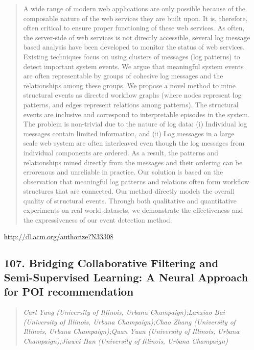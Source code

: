\documentclass{article}
\begin{document}
\begin{quote}
A wide range of modern web applications are only possible because of the composable nature of the web services they are built upon. It is, therefore, often critical to ensure proper functioning of these web services. As often, the server-side of web services is not directly accessible, several log message based analysis have been developed to monitor the status of web services. Existing techniques focus on using clusters of messages (log patterns) to detect important system events. We argue that meaningful system events are often representable by groups of cohesive log messages and the relationships among these groups. We propose a novel method to mine structural events as directed workflow graphs (where nodes represent log patterns, and edges represent relations among patterns). The structural events are inclusive and correspond to interpretable episodes in the system. The problem is non-trivial due to the nature of log data: (i) Individual log messages contain limited information, and (ii) Log messages in a large scale web system are often interleaved even though the log messages from individual components are ordered. As a result, the patterns and relationships mined directly from the messages and their ordering can be errorenous and unreliable in practice. Our solution is based on the observation that meaningful log patterns and relations often form workflow structures that are connected. Our method directly models the overall quality of structural events. Through both qualitative and quantitative experiments on real world datasets, we demonstrate the effectiveness and the expressiveness of our event detection method.
\end{quote}

\href{http://dl.acm.org/authorize?N33308}{http://dl.acm.org/authorize?N33308}

\subsection{107. Bridging Collaborative Filtering and Semi-Supervised Learning: A Neural Approach for POI recommendation}

\begin{quote}
\footnotesize{\textit{Carl Yang (University of Illinois, Urbana Champaign);Lanxiao Bai (University of Illinois, Urbana Champaign);Chao Zhang (University of Illinois, Urbana Champaign);Quan Yuan (University of Illinois, Urbana Champaign);Jiawei Han (University of Illinois, Urbana Champaign)}}

\end{quote}
\end{document}
